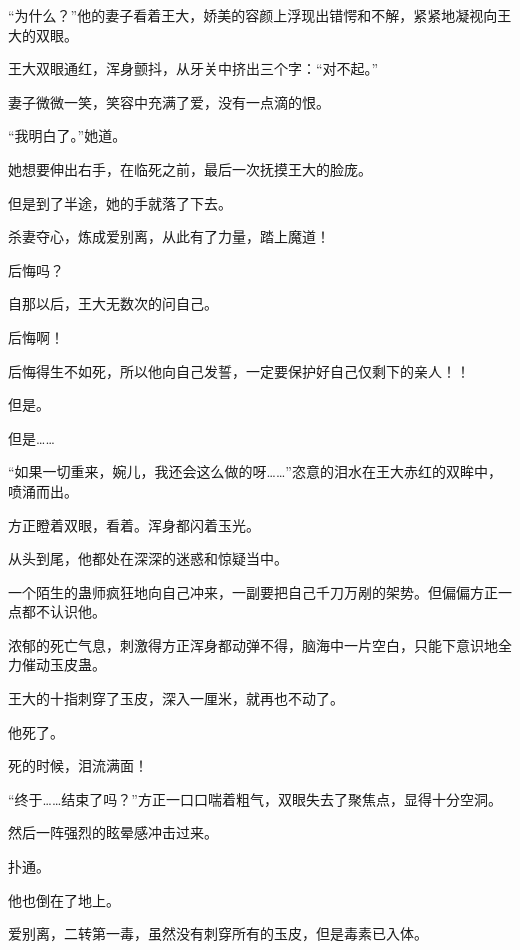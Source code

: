 \begin{this_body}
“为什么？”他的妻子看着王大，娇美的容颜上浮现出错愕和不解，紧紧地凝视向王大的双眼。

王大双眼通红，浑身颤抖，从牙关中挤出三个字：“对不起。”

妻子微微一笑，笑容中充满了爱，没有一点滴的恨。

“我明白了。”她道。

她想要伸出右手，在临死之前，最后一次抚摸王大的脸庞。

但是到了半途，她的手就落了下去。

杀妻夺心，炼成爱别离，从此有了力量，踏上魔道！

后悔吗？

自那以后，王大无数次的问自己。

后悔啊！

后悔得生不如死，所以他向自己发誓，一定要保护好自己仅剩下的亲人！！

但是。

但是……

“如果一切重来，婉儿，我还会这么做的呀……”恣意的泪水在王大赤红的双眸中，喷涌而出。

方正瞪着双眼，看着。浑身都闪着玉光。

从头到尾，他都处在深深的迷惑和惊疑当中。

一个陌生的蛊师疯狂地向自己冲来，一副要把自己千刀万剐的架势。但偏偏方正一点都不认识他。

浓郁的死亡气息，刺激得方正浑身都动弹不得，脑海中一片空白，只能下意识地全力催动玉皮蛊。

王大的十指刺穿了玉皮，深入一厘米，就再也不动了。

他死了。

死的时候，泪流满面！

“终于……结束了吗？”方正一口口喘着粗气，双眼失去了聚焦点，显得十分空洞。

然后一阵强烈的眩晕感冲击过来。

扑通。

他也倒在了地上。

爱别离，二转第一毒，虽然没有刺穿所有的玉皮，但是毒素已入体。

\end{this_body}


